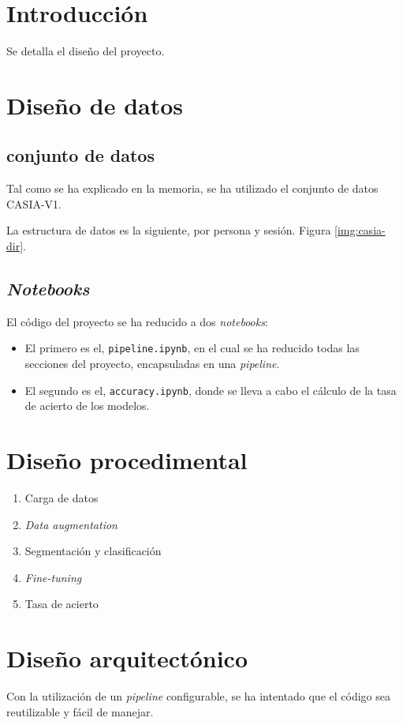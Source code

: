 
\section{Introducción}

Se detalla el diseño del proyecto.

\section{Diseño de datos}

\subsection{conjunto de datos} \label{anx:dataset}

Tal como se ha explicado en la memoria, se ha utilizado el conjunto de datos CASIA-V1.

La estructura de datos es la siguiente, por persona y sesión. Figura \ref{img:casia-dir}.


\subsection{\textit{Notebooks}}

El código del proyecto se ha reducido a dos \textit{notebooks}:


\begin{itemize}
    \item El primero es el, \texttt{pipeline.ipynb}, en el cual se ha reducido todas las secciones del proyecto, encapsuladas en una \textit{pipeline}.
    \item El segundo es el, \texttt{accuracy.ipynb}, donde se lleva a cabo el cálculo de la tasa de acierto de los modelos.
\end{itemize}


\section{Diseño procedimental}

\begin{enumerate}
    \item Carga de datos
    \item \textit{Data augmentation}
    \item Segmentación y clasificación
    \item \textit{Fine-tuning}
    \item Tasa de acierto
    \end{enumerate}

\section{Diseño arquitectónico}

Con la utilización de un \textit{pipeline} configurable, se ha intentado que el código sea reutilizable y fácil de manejar.
